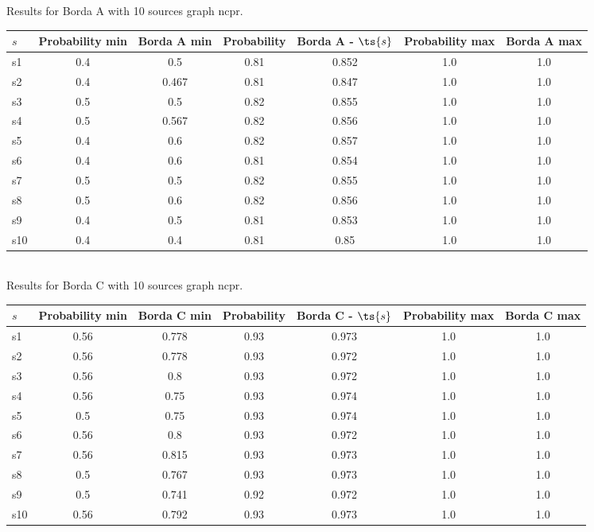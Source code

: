 \documentclass{article}
\begin{document}
\noindent Results for Borda A with 10 sources graph ncpr.

\noindent\begin{tabular}{|l|c|c|c|c|c|c|}
\hline
$s$& Probability min & Borda A min & Probability & Borda A - $\ts{s}$ & Probability max & Borda A max\\
\hline
s1 &0.4 & 0.5 & 0.81 & 0.852 & 1.0 & 1.0\\
\hline
s2 &0.4 & 0.467 & 0.81 & 0.847 & 1.0 & 1.0\\
\hline
s3 &0.5 & 0.5 & 0.82 & 0.855 & 1.0 & 1.0\\
\hline
s4 &0.5 & 0.567 & 0.82 & 0.856 & 1.0 & 1.0\\
\hline
s5 &0.4 & 0.6 & 0.82 & 0.857 & 1.0 & 1.0\\
\hline
s6 &0.4 & 0.6 & 0.81 & 0.854 & 1.0 & 1.0\\
\hline
s7 &0.5 & 0.5 & 0.82 & 0.855 & 1.0 & 1.0\\
\hline
s8 &0.5 & 0.6 & 0.82 & 0.856 & 1.0 & 1.0\\
\hline
s9 &0.4 & 0.5 & 0.81 & 0.853 & 1.0 & 1.0\\
\hline
s10 &0.4 & 0.4 & 0.81 & 0.85 & 1.0 & 1.0\\
\hline
\end{tabular}\\

\noindent Results for Borda C with 10 sources graph ncpr.

\noindent\begin{tabular}{|l|c|c|c|c|c|c|}
\hline
$s$& Probability min & Borda C min & Probability & Borda C - $\ts{s}$ & Probability max & Borda C max\\
\hline
s1 &0.56 & 0.778 & 0.93 & 0.973 & 1.0 & 1.0\\
\hline
s2 &0.56 & 0.778 & 0.93 & 0.972 & 1.0 & 1.0\\
\hline
s3 &0.56 & 0.8 & 0.93 & 0.972 & 1.0 & 1.0\\
\hline
s4 &0.56 & 0.75 & 0.93 & 0.974 & 1.0 & 1.0\\
\hline
s5 &0.5 & 0.75 & 0.93 & 0.974 & 1.0 & 1.0\\
\hline
s6 &0.56 & 0.8 & 0.93 & 0.972 & 1.0 & 1.0\\
\hline
s7 &0.56 & 0.815 & 0.93 & 0.973 & 1.0 & 1.0\\
\hline
s8 &0.5 & 0.767 & 0.93 & 0.973 & 1.0 & 1.0\\
\hline
s9 &0.5 & 0.741 & 0.92 & 0.972 & 1.0 & 1.0\\
\hline
s10 &0.56 & 0.792 & 0.93 & 0.973 & 1.0 & 1.0\\
\hline
\end{tabular}\\
\end{document}
